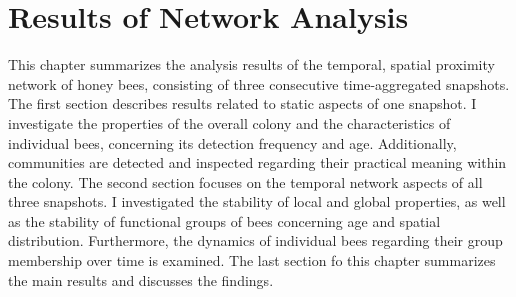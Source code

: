 \chapter{Results of Network Analysis}
\label{ch:results}
This chapter summarizes the analysis results of the temporal, spatial proximity network of honey bees, consisting of three consecutive time-aggregated snapshots.
The first section describes results related to static aspects of one snapshot.
I investigate the properties of the overall colony and the characteristics of individual bees, concerning its detection frequency and age.
Additionally, communities are detected and inspected regarding their practical meaning within the colony.
The second section focuses on the temporal network aspects of all three snapshots.
I investigated the stability of local and global properties, as well as the stability of functional groups of bees concerning age and spatial distribution. Furthermore, the dynamics of individual bees regarding their group membership over time is examined.
The last section fo this chapter summarizes the main results and discusses the findings.



\clearpage
